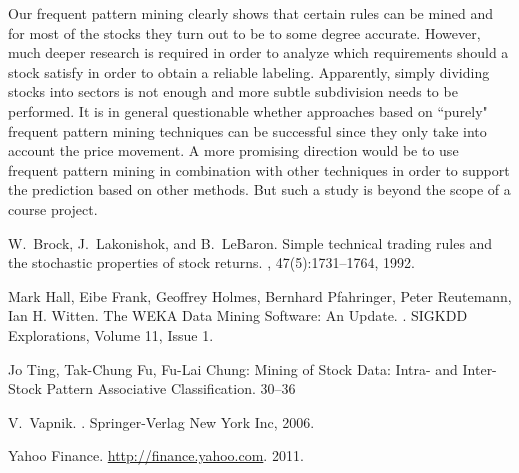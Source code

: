 \documentclass[10pt]{article}
\begin{document}
Our frequent pattern mining clearly shows that certain rules can be mined and
for most of the stocks they turn out to be to some degree accurate. However,
much deeper research is required in order to analyze which requirements should
a stock satisfy in order to obtain a reliable labeling. Apparently, simply
dividing stocks into sectors is not enough and more subtle subdivision needs to
be performed. It is in general questionable whether approaches based on
``purely" frequent pattern mining techniques can be successful since they only
take into account the price movement. A more promising direction would be to
use frequent pattern mining in combination with other techniques in order to
support the prediction based on other methods. But such a study is beyond the
scope of a course project.  
%

\begin{thebibliography}{1}
\small

\vspace{-0.25cm}
W.~Brock, J.~Lakonishok, and B.~LeBaron.
\newblock Simple technical trading rules and the stochastic properties of stock
  returns.
, 47(5):1731--1764, 1992.
\vspace{-0.25cm}

Mark Hall, Eibe Frank, Geoffrey Holmes, Bernhard Pfahringer, Peter Reutemann,
Ian H. Witten. \newblock The WEKA Data Mining Software: An Update. . SIGKDD Explorations, Volume 11, Issue 1. 
\vspace{-0.25cm}

Jo Ting, Tak-Chung Fu, Fu-Lai Chung: 
\newblock Mining of Stock Data: Intra- and Inter-Stock Pattern Associative Classification.  30--36
\vspace{-0.25cm}

V.~Vapnik.
.
\newblock Springer-Verlag New York Inc, 2006.
\vspace{-0.25cm}

Yahoo Finance.
\newblock \url{http://finance.yahoo.com}. 2011.

\end{thebibliography}
\end{document}
